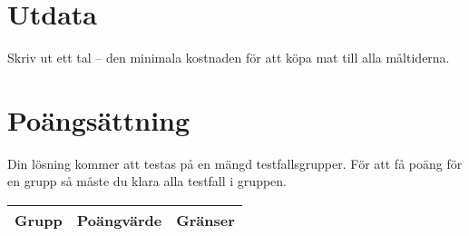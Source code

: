 \section*{Utdata}
Skriv ut ett tal -- den minimala kostnaden för att köpa mat till alla måltiderna.

\section*{Poängsättning}
Din lösning kommer att testas på en mängd testfallsgrupper. För att få poäng för en grupp
så måste du klara alla testfall i gruppen.

\noindent
\begin{tabular}{| l | l | l |}
\hline
Grupp & Poängvärde & Gränser \\ \hline
\end{tabular}
